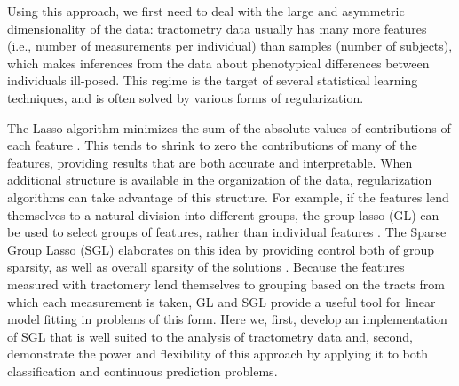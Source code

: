 Using this approach, we first need to deal with the large and
asymmetric dimensionality of the data: tractometry data usually has
many more features (i.e., number of measurements per individual) than
samples (number of subjects), which makes inferences from the data
about phenotypical differences between individuals ill-posed. This
regime is the target of several statistical learning techniques, and
is often solved by various forms of regularization.


The Lasso algorithm minimizes the sum of the absolute values of
contributions of each feature \cite{Tibshirani1996-qs}. This
tends to shrink to zero the contributions of many of the features,
providing results that are both accurate and interpretable. When
additional structure is available in the organization of the data,
regularization algorithms can take advantage of this structure. For
example, if the features lend themselves to a natural division into
different groups, the group lasso (GL) can be used to select groups
of features, rather than individual features \cite{Yuan2006-ky}.
The Sparse Group Lasso (SGL) elaborates on this idea by providing
control both of group sparsity, as well as overall sparsity of the
solutions \cite{simon2013sgl}. Because the features measured with
tractomery lend themselves to grouping based on the tracts from which
each measurement is taken, GL and SGL provide a useful tool
for linear model fitting in problems of this form. Here we, first,
develop an implementation of SGL that is well suited to the analysis of
tractometry data and, second, demonstrate the power and flexibility of
this approach by applying it to both classification
and continuous prediction problems.
